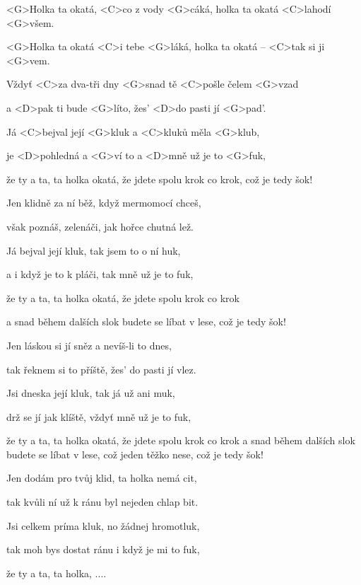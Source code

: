 

\zr
<G>Holka ta okatá, <C>co z vody <G>cáká,
holka ta okatá <C>lahodí <G>všem.

<G>Holka ta okatá <C>i tebe <G>láká,
holka ta okatá -- <C>tak si ji <G>vem.
\kr

\zs
Vždyť <C>za dva-tři dny <G>snad tě <C>pošle čelem <G>vzad

a <D>pak ti bude <G>líto, žes' <D>do pasti jí <G>pad'.

Já <C>bejval její <G>kluk a <C>kluků měla <G>klub,

je <D>pohledná a <G>ví to a <D>mně už je to <G>fuk,

že ty a ta, ta holka okatá, že jdete spolu krok co krok,
což je tedy šok!
\ks

\zr \kr

\zs
Jen klidně za ní běž, když mermomocí chceš,

však poznáš, zelenáči, jak hořce chutná lež.

Já bejval její kluk, tak jsem to o ní huk,

a i když je to k pláči, tak mně už je to fuk,

že ty a ta, ta holka okatá, že jdete spolu krok co krok

a snad během dalších slok budete se líbat v lese,
což je tedy šok!
\ks

\zr \kr

\zs
Jen láskou si jí sněz a nevíš-li to dnes,

tak řeknem si to příště, žes' do pasti jí vlez.

Jsi dneska její kluk, tak já už ani muk,

drž se jí jak klíště, vždyť mně už je to fuk,

že ty a ta, ta holka okatá, že jdete spolu krok co krok
a snad během dalších slok
budete se líbat v lese, což jeden těžko nese, což je tedy šok!
\ks

\zr \kr

\zs
Jen dodám pro tvůj klid, ta holka nemá cit,

tak kvůli ní už k ránu byl nejeden chlap bit.

Jsi celkem príma kluk, no žádnej hromotluk,

tak moh bys dostat ránu i když je mi to fuk,

že ty a ta, ta holka, ....
\ks

\kp







